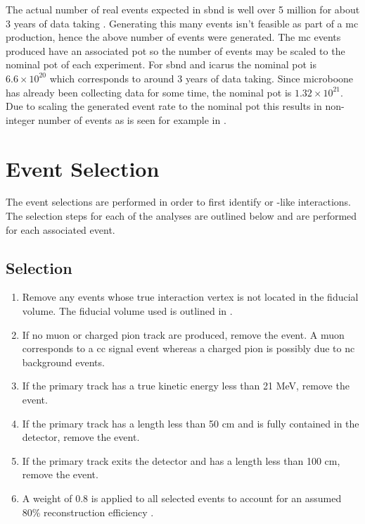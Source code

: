 The actual number of real \numu events expected in \gls{sbnd} is well over 5 million for about 3 years of data taking \cite{sbnd_pot}. Generating this many events isn't feasible as part of a \gls{mc} production, hence the above number of events were generated. The \gls{mc} events produced have an associated \gls{pot} so the number of events may be scaled to the nominal \gls{pot} of each experiment. For \gls{sbnd} and \gls{icarus} the nominal \gls{pot} is $6.6 \times 10^{20}$ which corresponds to around 3 years of data taking.  Since \gls{microboone} has already been collecting data for some time, the nominal \gls{pot} is $1.32 \times 10^{21}$. Due to scaling the generated event rate to the nominal \gls{pot} this results in non-integer number of events as is seen for example in .

\section{Event Selection}\label{sec:event_selection}

The event selections are performed in order to first identify \numu or \nue-like interactions. The selection steps for each of the analyses are outlined below and are performed for each associated event. 

\subsection{\texorpdfstring{\numu Selection}{numu Selection}}\label{sec:numu_selection}

\begin{enumerate}
  \item Remove any events whose true interaction vertex is not located in the fiducial volume. The fiducial volume used is outlined in .
  \item If no muon or charged pion track are produced, remove the event. A muon corresponds to a \gls{cc} signal event whereas a charged pion is possibly due to \gls{nc} background events. 
  \item If the primary track has a true kinetic energy less than 21 MeV, remove the event.
  \item If the primary track has a length less than 50 cm and is fully contained in the detector, remove the event.
  \item If the primary track exits the detector and has a length less than 100 cm, remove the event.
 \item A weight of 0.8 is applied to all selected events to account for an assumed 80\% reconstruction efficiency \cite{Rhiannon's_thesis}. 
\end{enumerate}

